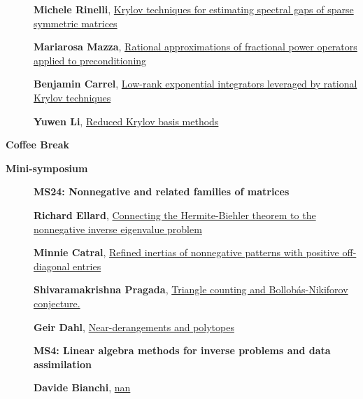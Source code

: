 \documentclass[ILAS2025-program.tex]{subfiles}
\begin{document}
\begin{description}
\begin{description}
    \item[] \hypertarget{up0193}{}\textbf{Michele Rinelli}, \hyperlink{down0193}{Krylov techniques for estimating spectral gaps of sparse symmetric matrices}
        \item[] \hypertarget{up0194}{}\textbf{Mariarosa Mazza}, \hyperlink{down0194}{Rational approximations of fractional power operators applied to preconditioning}
        \item[] \hypertarget{up0195}{}\textbf{Benjamin Carrel}, \hyperlink{down0195}{Low-rank exponential integrators leveraged by rational Krylov techniques
}
        \item[] \hypertarget{up0196}{}\textbf{Yuwen Li}, \hyperlink{down0196}{Reduced Krylov basis methods}
        \end{description}
    \item[\info{15:30\textrm{--}16:00}] \textbf{Coffee Break} 
    \item[\info{16:00\textrm{--}18:00}] \textbf{Mini-symposium} 
    \begin{description}
    \item[] {\color{mstitle}\textbf{MS24: Nonnegative and related families of matrices}} 
    \item[] \hypertarget{up0197}{}\textbf{Richard Ellard}, \hyperlink{down0197}{Connecting the Hermite-Biehler theorem to the nonnegative inverse eigenvalue problem}
        \item[] \hypertarget{up0198}{}\textbf{Minnie Catral}, \hyperlink{down0198}{Refined inertias of nonnegative patterns with positive off-diagonal entries}
        \item[] \hypertarget{up0199}{}\textbf{Shivaramakrishna Pragada}, \hyperlink{down0199}{Triangle counting and Bollob\'{a}s-Nikiforov conjecture.
}
        \item[] \hypertarget{up0200}{}\textbf{Geir Dahl}, \hyperlink{down0200}{Near-derangements and polytopes}
        \end{description}
    \begin{description}
    \item[] {\color{mstitle}\textbf{MS4: Linear algebra methods for inverse problems and data assimilation}} 
    \item[] \hypertarget{up0201}{}\textbf{Davide Bianchi}, \hyperlink{down0201}{nan}

\end{description}
\end{description}
\end{document}
